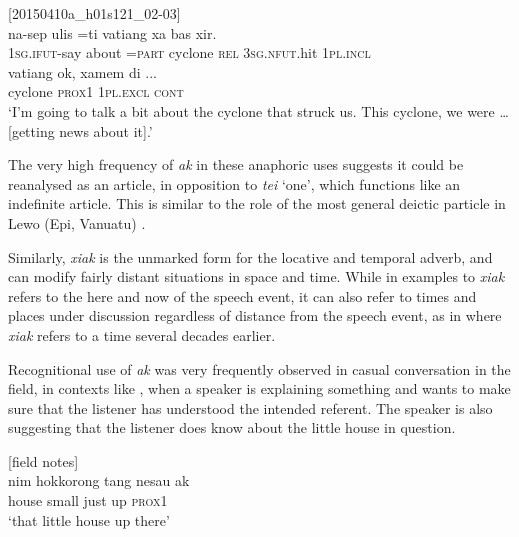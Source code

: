 \documentclass[output=paper,colorlinks,citecolor=brown]{langscibook}
\begin{document}
\ea
{\label{ex:ridge:40}[20150410a\_h01s121\_02-03]}\\
\gll na-sep     ulis   =ti   vatiang  xa      bas     xir.     \\
     \textsc{1sg.ifut-}say   about   =\textsc{part}  cyclone  \textsc{rel}  \textsc{3sg.nfut.}hit \textsc{1pl.incl}\\

\gll vatiang  ok,  xamem   di ...\\
     cyclone  \textsc{prox1}  \textsc{1pl.excl}  \textsc{cont}\\
\glt ‘I’m going to talk a bit about the cyclone that struck us. This cyclone, we were … [getting news about it].’
\z

The very high frequency of \textit{ak} in these anaphoric uses suggests it could be reanalysed as an article, in opposition to \textit{tei} ‘one’, which functions like an indefinite article. This is similar to the role of the most general deictic particle in Lewo (Epi, Vanuatu) \citep[225]{Early1994}.

Similarly, \textit{xiak} is the unmarked form for the locative and temporal adverb, and can modify fairly distant situations in space and time. While in examples  to  \textit{xiak} refers to the here and now of the speech event, it can also refer to times and places under discussion regardless of distance from the speech event, as in  where \textit{xiak} refers to a time several decades earlier.

Recognitional use of \textit{ak} was very frequently observed in casual conversation in the field, in contexts like , when a speaker is explaining something and wants to make sure that the listener has understood the intended referent. The speaker is also suggesting that the listener does know about the little house in question.

\ea
{\label{ex:ridge:41}[field notes]}\\
\gll nim  hokkorong  tang  nesau  ak\\
     house small just  up  \textsc{prox1}\\
\glt ‘that little house up there’
\z
\end{document}
